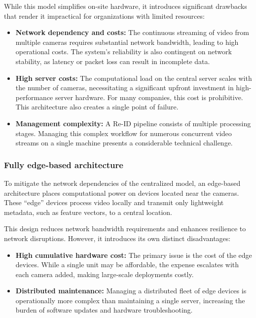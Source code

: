 \documentclass[../main.tex]{subfiles}
\begin{document}
While this model simplifies on-site hardware, it introduces significant drawbacks that render it impractical for organizations with limited resources:
\begin{itemize}
    \item \textbf{Network dependency and costs:} The continuous streaming of video from multiple cameras requires substantial network bandwidth, leading to high operational costs. The system's reliability is also contingent on network stability, as latency or packet loss can result in incomplete data.
    \item \textbf{High server costs:} The computational load on the central server scales with the number of cameras, necessitating a significant upfront investment in high-performance server hardware. For many companies, this cost is prohibitive. This architecture also creates a single point of failure.
    \item \textbf{Management complexity:} A Re-ID pipeline consists of multiple processing stages. Managing this complex workflow for numerous concurrent video streams on a single machine presents a considerable technical challenge.
\end{itemize}

\subsubsection{Fully edge-based architecture}
To mitigate the network dependencies of the centralized model, an edge-based architecture places computational power on devices located near the cameras. These ``edge'' devices process video locally and transmit only lightweight metadata, such as feature vectors, to a central location.

This design reduces network bandwidth requirements and enhances resilience to network disruptions. However, it introduces its own distinct disadvantages:
\begin{itemize}
    \item \textbf{High cumulative hardware cost:} The primary issue is the cost of the edge devices. While a single unit may be affordable, the expense escalates with each camera added, making large-scale deployments costly.
    \item \textbf{Distributed maintenance:} Managing a distributed fleet of edge devices is operationally more complex than maintaining a single server, increasing the burden of software updates and hardware troubleshooting.
\end{itemize}
\end{document}
